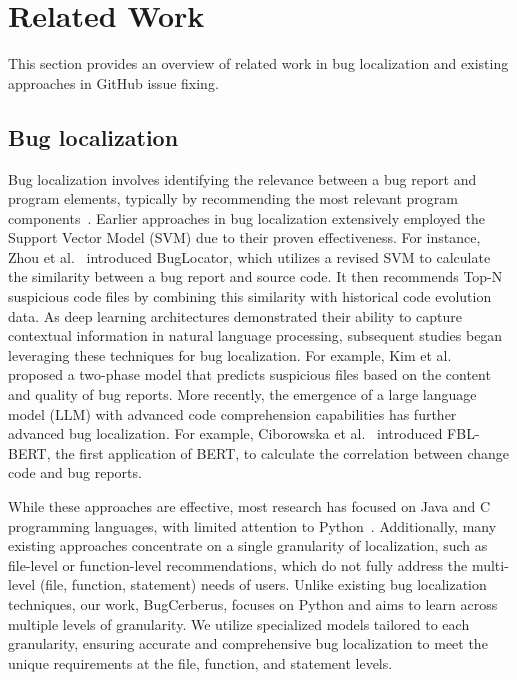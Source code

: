 \section{Related Work}
This section provides an overview of related work in bug localization and existing approaches in GitHub issue fixing.

\subsection{Bug localization}

Bug localization involves identifying the relevance between a bug report and program elements, typically by recommending the most relevant program components~\cite{Yang2021}. Earlier approaches in bug localization extensively employed the Support Vector Model (SVM) due to their proven effectiveness. For instance, Zhou et al.~\cite{Zhou2012} introduced BugLocator, which utilizes a revised SVM to calculate the similarity between a bug report and source code. It then recommends Top-N suspicious code files by combining this similarity with historical code evolution data. As deep learning architectures demonstrated their ability to capture contextual information in natural language processing, subsequent studies began leveraging these techniques for bug localization. For example, Kim et al.~\cite{Kim2013} proposed a two-phase model that predicts suspicious files based on the content and quality of bug reports. More recently, the emergence of a large language model (LLM) with advanced code comprehension capabilities has further advanced bug localization. For example, Ciborowska et al.~\cite{Ciborowska2022} introduced FBL-BERT, the first application of BERT, to calculate the correlation between change code and bug reports.

While these approaches are effective, most research has focused on Java and C programming languages, with limited attention to Python~\cite{Mohammad2024}. Additionally, many existing approaches concentrate on a single granularity of localization, such as file-level or function-level recommendations, which do not fully address the multi-level (file, function, statement) needs of users. Unlike existing bug localization techniques, our work, BugCerberus, focuses on Python and aims to learn across multiple levels of granularity. We utilize specialized models tailored to each granularity, ensuring accurate and comprehensive bug localization to meet the unique requirements at the file, function, and statement levels.

